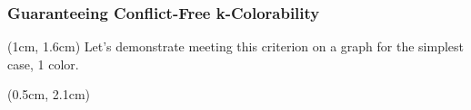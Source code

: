\documentclass[xcolor=dvipsnames,aspectratio=1610]{beamer}
\newcommand{\examplewidth}{16cm}
\begin{document}

  \begin{frame}
    \frametitle{Guaranteeing Conflict-Free k-Colorability}





    \begin{textblock*}{14cm}(1cm, 1.6cm) %
      Let's demonstrate meeting this criterion on a graph for the simplest case, 1 color.
    \end{textblock*}


    \begin{textblock*}{15cm}(0.5cm, 2.1cm) %


\end{textblock*}
\end{frame}
\end{document}
